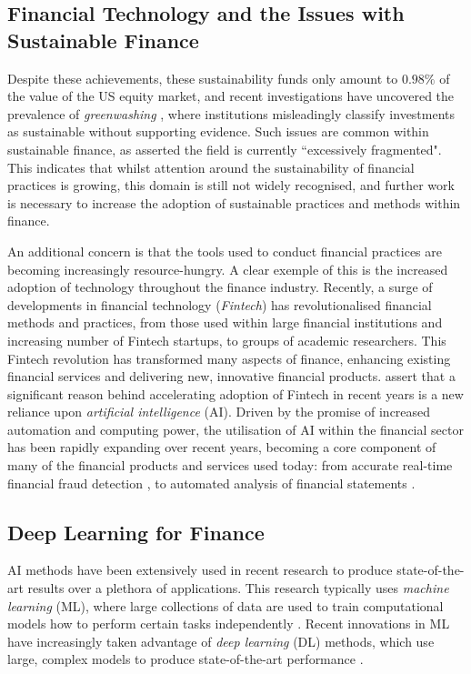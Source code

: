 \documentclass[a4paper, 11pt]{report}
\begin{document}
    \subsection{Financial Technology and the Issues with Sustainable Finance}
    
    Despite these achievements, these sustainability funds only amount to $0.98\%$ of the value of the US equity market, and recent investigations have uncovered the prevalence of \emph{greenwashing} \citep{popescu-2021}, where institutions misleadingly classify investments as sustainable without supporting evidence. Such issues are common within sustainable finance, as \citet{cunha-2021} asserted the field is currently ``excessively fragmented". This indicates that whilst attention around the sustainability of financial practices is growing, this domain is still not widely recognised, and further work is necessary to increase the adoption of sustainable practices and methods within finance. 

    An additional concern is that the tools used to conduct financial practices are becoming increasingly resource-hungry. A clear exemple of this is the increased adoption of technology throughout the finance industry. Recently, a surge of developments in financial technology (\emph{Fintech}) has revolutionalised financial methods and practices, from those used within large financial institutions and increasing number of Fintech startups, to groups of academic researchers. This Fintech revolution has transformed many aspects of finance, enhancing existing financial services and delivering new, innovative financial products. \citet{palmie-2020} assert that a significant reason behind accelerating adoption of Fintech in recent years is a new reliance upon \emph{artificial intelligence} (AI). Driven by the promise of increased automation and computing power, the utilisation of AI within the financial sector has been rapidly expanding over recent years, becoming a core component of many of the financial products and services used today: from accurate real-time financial fraud detection \citep{sadgali-2019}, to automated analysis of financial statements \citep{amel-2020}.


    \subsection{Deep Learning for Finance}

    AI methods have been extensively used in recent research to produce state-of-the-art results over a plethora of applications. This research typically uses \emph{machine learning} (ML), where large collections of data are used to train computational models how to perform certain tasks independently \citep{samuel-1959}. Recent innovations in ML have increasingly taken advantage of \emph{deep learning} (DL) methods, which use large, complex models to produce state-of-the-art performance \citep{witten-2017}.
\end{document}
